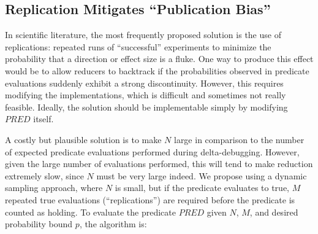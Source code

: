 \subsection{Replication Mitigates  ``Publication Bias''}

In scientific literature, the most frequently proposed solution is the
use of replications:  repeated runs of ``successful'' experiments to
minimize the probability that a direction or effect size is a fluke.  One way to produce this effect would be to allow
reducers to backtrack if the probabilities observed in predicate
evaluations suddenly exhibit a strong discontinuity.  However, this requires
modifying the implementations, which is difficult and
sometimes not really feasible.  Ideally, the solution
should be implementable simply by modifying $\mathit{PRED}$ itself.

A costly but plausible solution is to make $N$ large in comparison to
the number of expected predicate evaluations performed during
delta-debugging.  However, given the large number of evaluations performed,
this will tend to make reduction extremely slow, since $N$ must be
very large indeed.  We propose
using a dynamic sampling approach, where $N$ is small, but if the
predicate evaluates to true, $M$ repeated true evaluations
(``replications'') are
required before the predicate is counted as holding.  To evaluate the predicate $\mathit{PRED}$ given $N$,
$M$, and desired probability bound $p$, the algorithm is:

